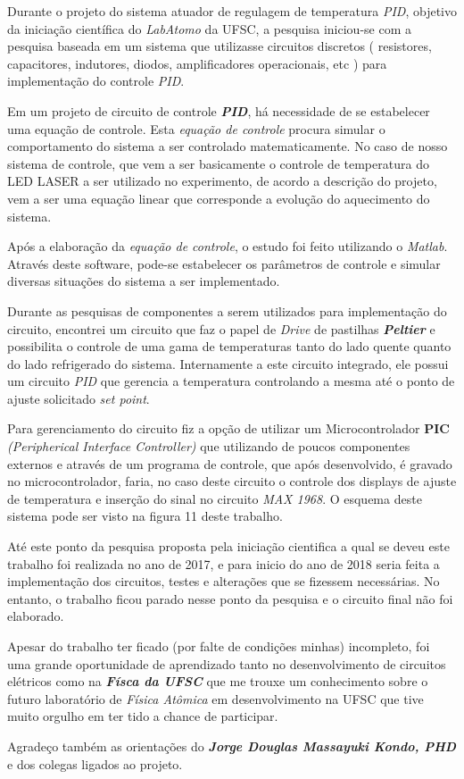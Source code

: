 Durante o projeto do sistema atuador de regulagem de temperatura \emph{PID}, objetivo da iniciação científica do \emph{LabAtomo} da UFSC, a pesquisa iniciou-se com a pesquisa baseada em um sistema que utilizasse circuitos discretos ( resistores, capacitores, indutores, diodos, amplificadores operacionais, etc ) para implementação do controle \emph{PID}.

Em um projeto de circuito de controle \textbf{\emph{PID}}, há necessidade de se estabelecer uma equação de controle. Esta \emph{equação de controle} procura simular o comportamento do sistema a ser controlado matematicamente. No caso de nosso sistema de controle, que vem a ser basicamente o controle de temperatura do LED LASER a ser utilizado no experimento, de acordo a descrição do projeto, vem a ser uma equação linear que corresponde a evolução do aquecimento do sistema. 

Após a elaboração da \emph{equação de controle}, o estudo foi feito utilizando o \emph{Matlab\tiny\textregistered}. Através deste software, pode-se estabelecer os parâmetros de controle e simular diversas situações do sistema a ser implementado. 

Durante as pesquisas de componentes a serem utilizados para implementação do circuito, encontrei um circuito que faz o papel de \emph{Drive} de pastilhas \textbf{\emph{Peltier}} e possibilita o controle de uma gama de temperaturas tanto do lado quente quanto do lado refrigerado do sistema. 
Internamente a este circuito integrado, ele possui um circuito \emph{PID} que gerencia a temperatura controlando a mesma até o ponto de ajuste solicitado \textit{set point}. 

Para gerenciamento do circuito fiz a opção de utilizar um Microcontrolador  \textbf{PIC} \emph{(Peripherical Interface Controller) } que utilizando de poucos componentes externos e através de um programa de controle, que após desenvolvido, é gravado no microcontrolador, faria, no caso deste circuito o controle dos displays de ajuste de temperatura e inserção do sinal no circuito \emph{MAX 1968}. O esquema deste sistema pode ser visto na figura 11 deste trabalho.

Até este ponto da pesquisa proposta pela iniciação cientifica a qual se deveu este trabalho foi realizada no ano de 2017, e para inicio do ano de 2018 seria feita a implementação dos circuitos, testes e alterações que se fizessem necessárias. No entanto, o trabalho ficou parado nesse ponto da pesquisa e o circuito final não foi elaborado. 

Apesar do trabalho ter ficado (por falte de condições minhas) incompleto, foi uma grande oportunidade de aprendizado tanto no desenvolvimento de circuitos elétricos como na \textbf{\emph{Físca da UFSC}} que me trouxe um conhecimento sobre o futuro laboratório de \emph{Física Atômica} em desenvolvimento na UFSC que tive muito orgulho em ter tido a chance de participar. 

Agradeço também as orientações do \textbf{\emph{Jorge Douglas Massayuki Kondo, PHD}} e dos colegas ligados ao projeto. 


